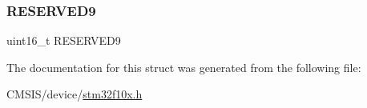 \mbox{\label{struct_r_t_c___type_def_ad8b1fadb520f7a200ee0046e110edc79}} 
\subsubsection{\texorpdfstring{RESERVED9}{RESERVED9}}
{\footnotesize\ttfamily uint16\+\_\+t R\+E\+S\+E\+R\+V\+E\+D9}



The documentation for this struct was generated from the following file\+:\begin{DoxyCompactItemize}
\item 
C\+M\+S\+I\+S/device/\mbox{\hyperlink{stm32f10x_8h}{stm32f10x.\+h}}\end{DoxyCompactItemize}
